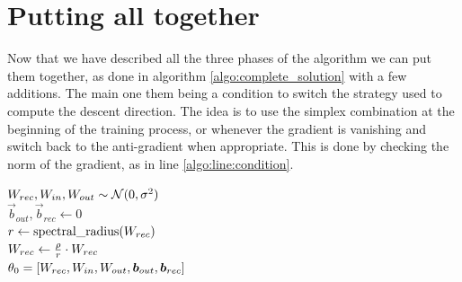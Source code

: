 \section{Putting all together}
Now that we have described all the three phases of the algorithm we can put them together, as done in algorithm \ref{algo:complete_solution} with a few additions. The main one them being a condition to switch the strategy used to compute the descent direction. The idea is to use the simplex combination at the beginning of the training process, or whenever the gradient is vanishing and switch back to the anti-gradient when appropriate. This is done by checking the norm of the gradient, as in line \ref{algo:line:condition}.


\begin{algorithm}[]
	
	\BlankLine
	
	$W_{rec}, W_{in}, W_{out} \sim \mathcal{N}(0, \sigma^2)$\\
	$\vec{b}_{out}, \vec{b}_{rec} \gets 0$\\
	$r \gets \mbox{spectral\_radius}(W_{rec})$\\
	$W_{rec}\gets \frac{\rho}{r} \cdot W_{rec}$\\
	$\theta_0 = [W_{rec}, W_{in}, W_{out},\boldsymbol{b}_{out}, \boldsymbol{b}_{rec}]$

	
	\BlankLine
\end{algorithm}
